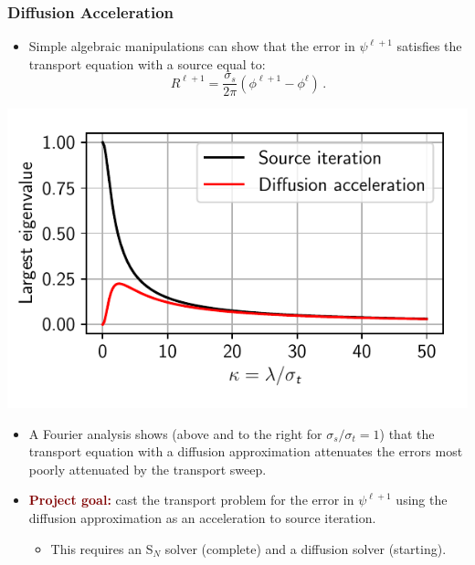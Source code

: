 \documentclass[xcolor={usenames,dvipsnames,svgnames,table}]{beamer}
\begin{document}

\begin{frame}\frametitle{Diffusion Acceleration}
	\begin{minipage}{0.48\linewidth}
		\begin{itemize}
			\item Simple algebraic manipulations can show that the error in $\psi^{\ell + 1}$ satisfies the transport equation with a source equal to:
			\[
				R^{\ell + 1} = \frac{\sigma_s}{2\pi} (\phi^{\ell + 1} - \phi^\ell)\,.
			\]
		\end{itemize}
	\end{minipage}
	\hfill
	\begin{minipage}{0.48\linewidth}
		\includegraphics[width=\linewidth]{plots/eigenvalues}
	\end{minipage}
	\vspace{-0.2cm}
	\begin{itemize}
		\item A Fourier analysis shows (above and to the right for $\sigma_s / \sigma_t = 1$) that the transport equation with a diffusion approximation attenuates the errors most poorly attenuated by the transport sweep.
		\vspace{0.05cm}
		\item \textbf{\textcolor{Maroon}{Project goal:}} cast the transport problem for the error in $\psi^{\ell + 1}$ using the diffusion approximation as an acceleration to source iteration.
		\begin{itemize}
			\footnotesize
			\vspace{0.05cm}
			\item This requires an S$_N$ solver (complete) and a diffusion solver (starting).
		\end{itemize}
	\end{itemize}
\end{frame}
\end{document}
